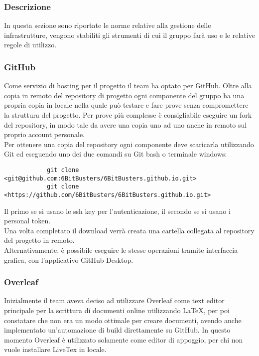\subsubsection{Descrizione}
In questa sezione sono riportate le norme relative alla gestione delle
infrastrutture, vengono stabiliti gli strumenti di cui il gruppo farà uso e le
relative regole di utilizzo.

\subsubsection{GitHub}
Come servizio di hosting per il progetto il team ha optato per GitHub. Oltre
alla copia in remoto del repository di progetto ogni componente del gruppo ha
una propria copia in locale nella quale può testare e fare prove senza
compromettere la struttura del progetto. Per prove più complesse è
consigliabile eseguire un fork del repository, in modo tale da avere una
copia uno ad uno anche in remoto sul proprio account personale.\\ Per ottenere
una copia del repository ogni componente deve scaricarla utilizzando Git ed
eseguendo uno dei due comandi su Git bash o terminale windows:
\begin{verbatim}
            git clone <git@github.com:6BitBusters/6BitBusters.github.io.git>
            git clone <https://github.com/6BitBusters/6BitBusters.github.io.git>
        \end{verbatim}
Il primo se si usano le ssh key per l'autenticazione, il secondo se si usano i
personal token.\\ Una volta completato il download verrà creata una cartella
collegata al repository del progetto in remoto.\\ Alternativamente, è possibile
eseguire le stesse operazioni tramite interfaccia grafica, con l'applicativo
GitHub Desktop.

\subsubsection{Overleaf}
Inizialmente il team aveva deciso ad utilizzare Overleaf come text editor
principale per la scrittura di documenti online utilizzando LaTeX, per poi
constatare che non era un modo ottimale per creare documenti, avendo anche
implementato un'automazione di build direttamente su GitHub. In questo momento
Overleaf è utilizzato solamente come editor di appoggio, per chi non vuole
installare LiveTex in locale.

